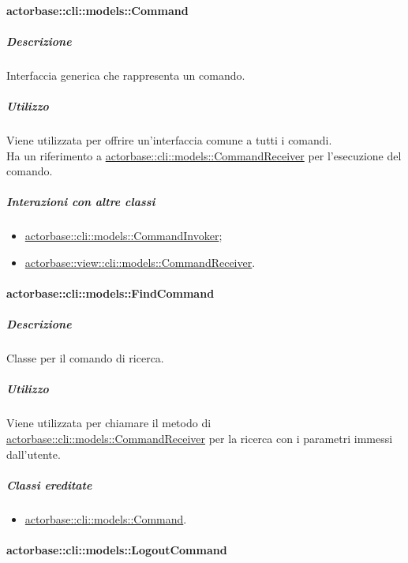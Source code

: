 \documentclass{scalatekids-article}
\begin{document}
\paragraph{actorbase::cli::models::Command}
\label{sec:actorbase::cli::models::Command}

\subparagraph{Descrizione}

Interfaccia generica che rappresenta un comando.

\subparagraph{Utilizzo}

Viene utilizzata per offrire un'interfaccia comune a tutti i comandi.\\Ha un
riferimento a \hyperref[sec:actorbase::cli::models::CommandReceiver]{actorbase::cli::models::CommandReceiver} per l'esecuzione del
comando.

\subparagraph{Interazioni con altre classi}

\begin{itemize}
\item \hyperref[sec:actorbase::cli::models::CommandInvoker]{actorbase::cli::models::CommandInvoker};
\item \hyperref[sec:actorbase::view::cli::models::CommandReceiver]{actorbase::view::cli::models::CommandReceiver}.
\end{itemize}

\paragraph{actorbase::cli::models::FindCommand}
\label{sec:actorbase::cli::models::FindCommand}

\subparagraph{Descrizione}

Classe per il comando di ricerca.

\subparagraph{Utilizzo}

Viene utilizzata per chiamare il metodo di
\hyperref[sec:actorbase::cli::models::CommandReceiver]{actorbase::cli::models::CommandReceiver} per la ricerca con i parametri immessi
dall'utente.

\subparagraph{Classi ereditate}

\begin{itemize}
\item \hyperref[sec:actorbase::cli::models::Command]{actorbase::cli::models::Command}.
\end{itemize}

\paragraph{actorbase::cli::models::LogoutCommand}
\label{sec:actorbase::cli::models::LogoutCommand}
\end{document}
